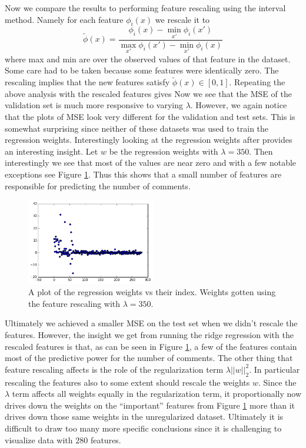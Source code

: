 \documentclass[10pt]{article}
\begin{document}
%
%

Now we compare the results to performing feature rescaling using the interval method. Namely for each feature $\phi_i(x)$ we rescale it to 
%
%
%
\begin{equation*}
\tilde{\phi}(x) = \frac{\phi_i(x) - \min_{x'}\phi_i(x')}{\max_{x'}\phi_i(x') - \min_{x'}\phi_i(x)}
\end{equation*}
 where max and min are over the observed values of that feature in the dataset. Some care had to be taken because some features were identically zero. The rescaling implies that the new features satisfy $\tilde{\phi}(x) \in [0,1]$.  Repeating the above analysis with the rescaled features gives
 Now we see that the MSE of the validation set is much more responsive to varying $\lambda$. However, we again notice that the plots of MSE look very different for the validation and test sets. This is somewhat surprising since neither of these datasets was used to train the regression weights. Interestingly looking at the regression weights after provides an interesting insight. Let $w$ be the regression weights with $\lambda = 350$. Then interestingly we see that most of the values are near zero and with a few notable exceptions see Figure \ref{reg-weights-lam-350-normalize-true}. Thus this shows that a small number of features are responsible for predicting the number of comments.
%
 \begin{figure}[h]
\centering
\includegraphics[width=0.5\textwidth]{reg-weights-lam-350-normalize-true}
\caption{A plot of the regression weights vs their index. Weights gotten using the feature rescaling with $\lambda = 350$. }
\label{reg-weights-lam-350-normalize-true}
\end{figure}
%
%
Ultimately we achieved a smaller MSE on the test set when we didn't rescale the features. However, the insight we get from running the ridge regression with the rescaled features is that, as can be seen in Figure \ref{reg-weights-lam-350-normalize-true}, a few of the features contain most of the predictive power for the number of comments. The other thing that feature rescaling affects is the role of the regularization term $\lambda ||w||_2^2$. In particular rescaling the features also to some extent should rescale the weights $w$. Since the $\lambda$ term affects all weights equally in the regularization term, it proportionally now drives down the weights on the ``important'' features from Figure \ref{reg-weights-lam-350-normalize-true} more than it drives down those same weights in the unregularized dataset. Ultimately it is difficult to draw too many more specific conclusions since it is challenging to visualize data with $280$ features.
\end{document}
